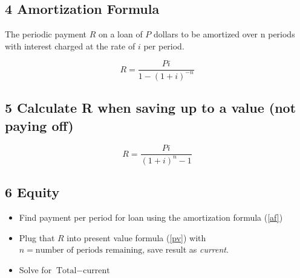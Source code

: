 \documentclass[twocolumn]{article}
\begin{document}
	\subsection*{4 Amortization Formula}
	The periodic payment $R$ on a loan of $P$ dollars to be amortized over n periods with interest charged at the rate of $i$ per period.
	
	\begin{equation} \label{af}
		R = \frac{Pi}{1-(1+i)^{-n}}
	\end{equation}

	\subsection*{5 Calculate R when saving up to a value (not paying off)}
	
	\begin{equation}
		R = \frac{Pi}{(1+i)^n-1}
	\end{equation}

	\subsection*{6 Equity}
	
	\begin{itemize}[label=--]
		\item Find payment per period for loan using the amortization formula (\ref{af})
		\item Plug that $R$ into present value formula (\ref{pv}) with $n = \text{number of periods remaining}$, save result as \emph{current}.
		\item Solve for $\text{Total} - \text{current}$
	\end{itemize}
\end{document}
